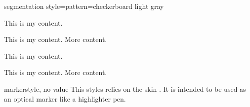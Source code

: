 \begin{dispExample*}{segmentation style={pattern=checkerboard light gray}}
\begin{tcbraster}[skin=enhancedmiddle jigsaw,raster equal height,raster columns=4,
    colback=LightGreen,colframe=DarkGreen,colbacktitle=LimeGreen!75!DarkGreen,
    opacityframe=0.5,opacityback=0.5,opacitybacktitle=0.5,
    left=1mm,right=1mm,top=1mm,bottom=1mm,middle=1mm]
  \begin{tcolorbox}
    This is my content.
  \end{tcolorbox}
  \begin{tcolorbox}
    This is my content.
    \tcblower
    More content.
  \end{tcolorbox}
  \begin{tcolorbox}[adjusted title=My title]
    This is my content.
  \end{tcolorbox}
  \begin{tcolorbox}[adjusted title=My title]
    This is my content.
    \tcblower
    More content.
  \end{tcolorbox}
\end{tcbraster}
\end{dispExample*}


\begin{docTcbKey}{marker}{}{style, no value}
  This styles relies on the skin . It is
  intended to be used as an optical marker like a highlighter pen.
\begin{dispExample}
\begin{tcolorbox}[marker]
\lipsum[2]
\end{tcolorbox}
\end{dispExample}
\end{docTcbKey}

\clearpage

